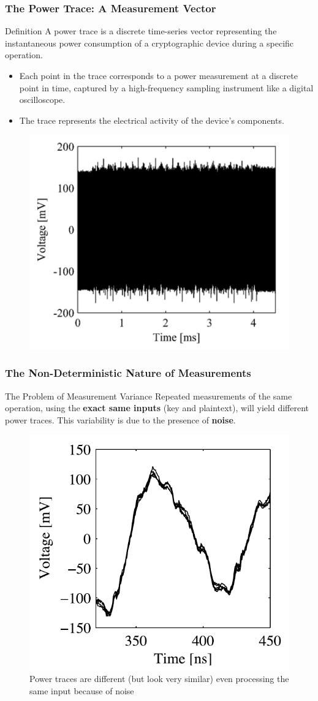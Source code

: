 \begin{frame}
    \frametitle{The Power Trace: A Measurement Vector}

    \begin{block}{Definition}
        A power trace is a discrete time-series vector representing the instantaneous power consumption of a cryptographic device during a specific operation.
        \begin{itemize}
            \item Each point in the trace corresponds to a power measurement at a discrete point in time, captured by a high-frequency sampling instrument like a digital oscilloscope.
            \item The trace represents the electrical activity of the device's components.
        \end{itemize}
    \end{block}

    \begin{figure}
        \centering
        \includegraphics[width=0.35\linewidth]{main thing/Pictures/trace.png}
    \end{figure}
\end{frame}

\begin{frame}
    \frametitle{The Non-Deterministic Nature of Measurements}

    \begin{block}{The Problem of Measurement Variance}
        Repeated measurements of the same operation, using the \textbf{exact same inputs} (key and plaintext), will yield different power traces.\newline
        This variability is due to the presence of \textbf{noise}.
    \end{block}
    
    \begin{figure}
        \centering
        \includegraphics[width=0.4\linewidth]{main thing/Pictures/noise.png}
        \caption{Power traces are different (but look very similar) even processing the same input because of noise}
    \end{figure}
\end{frame}


